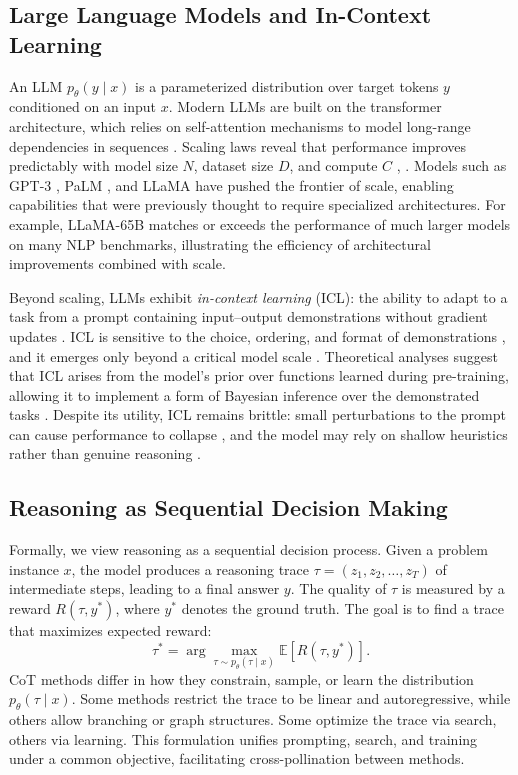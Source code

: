 \documentclass[11pt,a4paper]{article}
\begin{document}
\subsection{Large Language Models and In-Context Learning}
An LLM $p_\theta(y \mid x)$ is a parameterized distribution over target tokens $y$ conditioned on an input $x$. Modern LLMs are built on the transformer architecture, which relies on self-attention mechanisms to model long-range dependencies in sequences \citep{vaswani2017attention}. Scaling laws reveal that performance improves predictably with model size $N$, dataset size $D$, and compute $C$ \citep{rae2021scaling}, \citep{chowdhery2022palm}. Models such as GPT-3 \citep{brown2020language}, PaLM \citep{chowdhery2022palm}, and LLaMA \citep{touvron2023llama} have pushed the frontier of scale, enabling capabilities that were previously thought to require specialized architectures. For example, LLaMA-65B matches or exceeds the performance of much larger models on many NLP benchmarks, illustrating the efficiency of architectural improvements combined with scale.

Beyond scaling, LLMs exhibit \textit{in-context learning} (ICL): the ability to adapt to a task from a prompt containing input--output demonstrations without gradient updates \citep{brown2020language}. ICL is sensitive to the choice, ordering, and format of demonstrations \citep{min2022rethinking}, and it emerges only beyond a critical model scale \citep{wei2022emergent}. Theoretical analyses suggest that ICL arises from the model's prior over functions learned during pre-training, allowing it to implement a form of Bayesian inference over the demonstrated tasks \citep{dong2022survey}. Despite its utility, ICL remains brittle: small perturbations to the prompt can cause performance to collapse \citep{webson2021prompt}, and the model may rely on shallow heuristics rather than genuine reasoning \citep{ye2022unreliability}.

\subsection{Reasoning as Sequential Decision Making}
Formally, we view reasoning as a sequential decision process. Given a problem instance $x$, the model produces a reasoning trace $\tau = (z_1, z_2, \dots, z_T)$ of intermediate steps, leading to a final answer $y$. The quality of $\tau$ is measured by a reward $R(\tau, y^*)$, where $y^*$ denotes the ground truth. The goal is to find a trace that maximizes expected reward:
\begin{equation}
\tau^* = \arg\max_{\tau \sim p_\theta(\tau \mid x)} \mathbb{E}[R(\tau, y^*)].
\end{equation}
CoT methods differ in how they constrain, sample, or learn the distribution $p_\theta(\tau \mid x)$. Some methods restrict the trace to be linear and autoregressive, while others allow branching or graph structures. Some optimize the trace via search, others via learning. This formulation unifies prompting, search, and training under a common objective, facilitating cross-pollination between methods.
\end{document}
